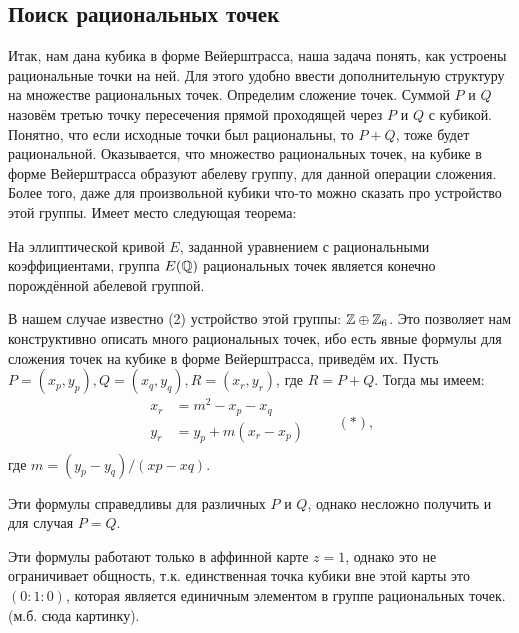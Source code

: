 \subsection*{Поиск рациональных точек}


Итак, нам дана кубика в форме Вейерштрасса, наша задача понять, как устроены
рациональные точки на ней. Для этого удобно ввести дополнительную структуру на
множестве рациональных точек. Определим сложение точек.  Суммой \(P\) и \(Q\)
назовём третью точку пересечения прямой проходящей через \(P\) и \(Q\) с
кубикой. Понятно, что если исходные точки был рациональны, то \(P + Q\), тоже
будет рациональной.  Оказывается, что множество рациональных точек, на кубике
в форме Вейерштрасса образуют абелеву группу, для данной операции сложения.
Более того, даже для произвольной кубики что-то можно сказать про устройство
этой группы. Имеет место следующая теорема:

\begin{theoremf}
    На эллиптической кривой \(E\), заданной уравнением с рациональными
    коэффициентами, группа \(E(\mathbb{Q})\) рациональных точек является
    конечно порождённой абелевой группой.
\end{theoremf}

В нашем случае известно (2) устройство этой группы:
\(\mathbb{Z} \oplus \mathbb{Z}_6\). Это позволяет нам конструктивно описать много
рациональных точек, ибо есть явные формулы для сложения точек на кубике в форме
Вейерштрасса, приведём их. Пусть \(P = (x_{p}, y_{p}), Q = (x_{q}, y_{q}), R =
(x_{r}, y_{r})\), где \(R = P + Q\). Тогда мы имеем:
\[
\begin{aligned}
    x_r &= m^2 - x_p - x_q \\
    y_r &= y_p + m(x_r - x_p) \\
\end{aligned} \qquad (*)
,\] 
где \(m = (y_{p} - y_{q}) / (x{p} - x{q})\).


\begin{remark}
    Эти формулы справедливы для различных \(P\) и \(Q\), однако несложно получить и
    для случая \(P = Q\).
\end{remark}

\begin{remark}
    Эти формулы работают только в аффинной карте \(z = 1\), однако это не
    ограничивает общность, т.к. единственная точка кубики вне этой карты это
    \((0 : 1 : 0)\), которая является единичным элементом в группе рациональных точек. (м.б.
    сюда картинку).
\end{remark}

